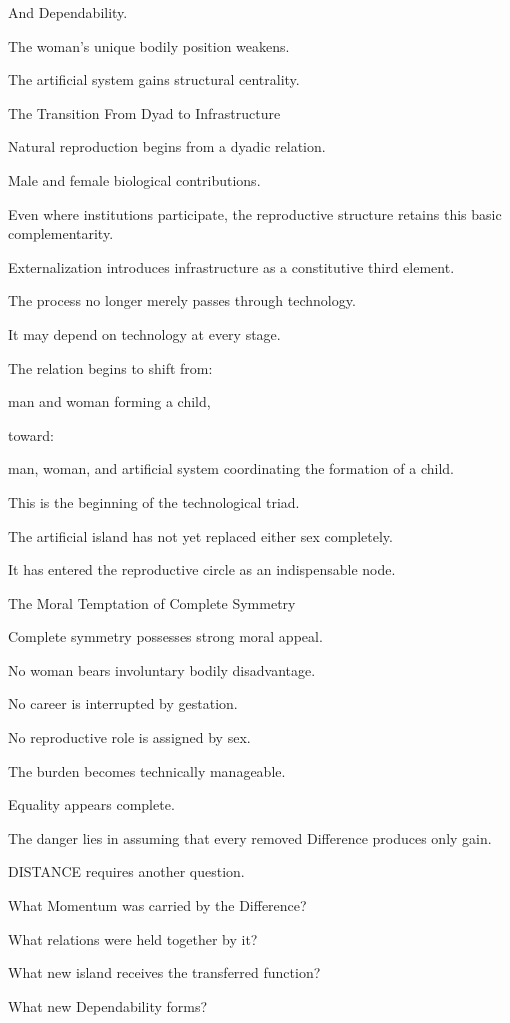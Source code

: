 And Dependability.

The woman’s unique bodily position weakens.

The artificial system gains structural centrality.

The Transition From Dyad to Infrastructure

Natural reproduction begins from a dyadic relation.

Male and female biological contributions.

Even where institutions participate, the reproductive structure retains this basic complementarity.

Externalization introduces infrastructure as a constitutive third element.

The process no longer merely passes through technology.

It may depend on technology at every stage.

The relation begins to shift from:

man and woman forming a child,

toward:

man, woman, and artificial system coordinating the formation of a child.

This is the beginning of the technological triad.

The artificial island has not yet replaced either sex completely.

It has entered the reproductive circle as an indispensable node.

The Moral Temptation of Complete Symmetry

Complete symmetry possesses strong moral appeal.

No woman bears involuntary bodily disadvantage.

No career is interrupted by gestation.

No reproductive role is assigned by sex.

The burden becomes technically manageable.

Equality appears complete.

The danger lies in assuming that every removed Difference produces only gain.

DISTANCE requires another question.

What Momentum was carried by the Difference?

What relations were held together by it?

What new island receives the transferred function?

What new Dependability forms?

